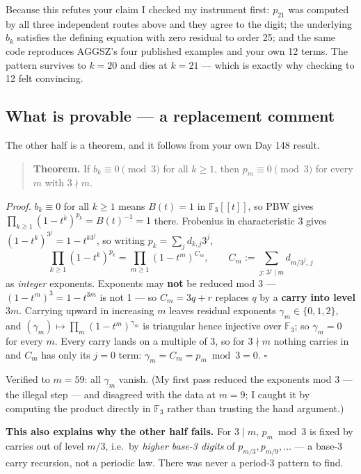 \documentclass[11pt]{article}
\begin{document}
Because this refutes your claim I checked my instrument first: $p_{21}$ was
computed by all three independent routes above and they agree to the digit; the
underlying $b_k$ satisfies the defining equation with zero residual to order 25;
and the same code reproduces AGGSZ's four published examples and your own 12
terms. The pattern survives to $k=20$ and dies at $k=21$ --- which is exactly why
checking to 12 felt convincing.

\subsection{What is provable --- a replacement comment}
The other half is a theorem, and it follows from your own Day 148 result.

\begin{quote}
\textbf{Theorem.} If $b_k\equiv0\pmod 3$ for all $k\ge1$, then $p_m\equiv0\pmod3$
for every $m$ with $3\nmid m$.
\end{quote}

\emph{Proof.} $b_k\equiv0$ for all $k\ge1$ means $B(t)=1$ in $\mathbb F_3[[t]]$,
so PBW gives $\prod_{k\ge1}(1-t^k)^{p_k}=B(t)^{-1}=1$ there. Frobenius in
characteristic 3 gives $(1-t^k)^{3^j}=1-t^{k3^j}$, so writing $p_k=\sum_j d_{k,j}3^j$,
\[ \prod_{k\ge1}(1-t^k)^{p_k}=\prod_{m\ge1}(1-t^m)^{C_m},\qquad
   C_m:=\sum_{j:\,3^j\mid m} d_{m/3^j,\,j}\]
as \emph{integer} exponents. Exponents may \textbf{not} be reduced mod 3 ---
$(1-t^m)^3=1-t^{3m}$ is not 1 --- so $C_m=3q+r$ replaces $q$ by a \textbf{carry
into level $3m$}. Carrying upward in increasing $m$ leaves residual exponents
$\gamma_m\in\{0,1,2\}$, and $(\gamma_m)\mapsto\prod_m(1-t^m)^{\gamma_m}$ is
triangular hence injective over $\mathbb F_3$; so $\gamma_m=0$ for every $m$.
Every carry lands on a multiple of 3, so for $3\nmid m$ nothing carries in and
$C_m$ has only its $j=0$ term: $\gamma_m=C_m=p_m\bmod3=0$. $\square$

Verified to $m=59$: all $\gamma_m$ vanish. (My first pass reduced the exponents
mod 3 --- the illegal step --- and disagreed with the data at $m=9$; I caught it
by computing the product directly in $\mathbb F_3$ rather than trusting the hand
argument.)

\textbf{This also explains why the other half fails.} For $3\mid m$, $p_m \bmod 3$
is fixed by carries out of level $m/3$, i.e.\ by \emph{higher base-3 digits} of
$p_{m/3},p_{m/9},\dots$ --- a base-3 carry recursion, not a periodic law. There
was never a period-3 pattern to find.
\end{document}
